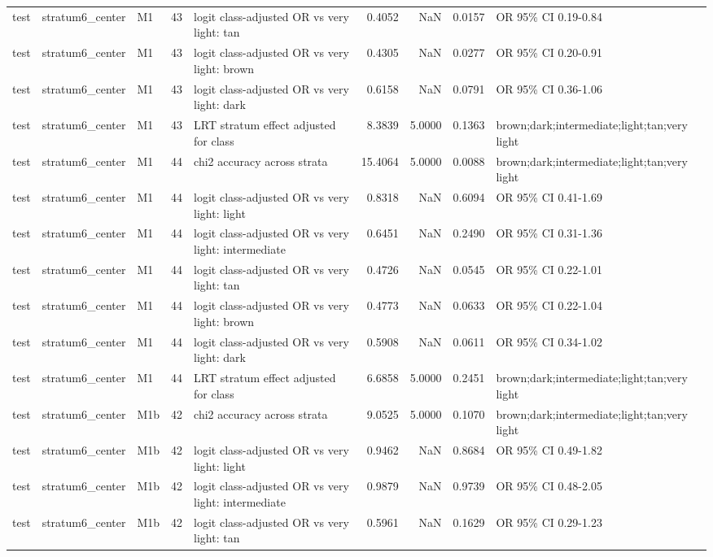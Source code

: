 \begin{tabular}{lllrlrrrl}
test & stratum6\_center & M1 & 43 & logit class-adjusted OR vs very light: tan & 0.4052 & NaN & 0.0157 & OR 95\% CI 0.19-0.84 \\
test & stratum6\_center & M1 & 43 & logit class-adjusted OR vs very light: brown & 0.4305 & NaN & 0.0277 & OR 95\% CI 0.20-0.91 \\
test & stratum6\_center & M1 & 43 & logit class-adjusted OR vs very light: dark & 0.6158 & NaN & 0.0791 & OR 95\% CI 0.36-1.06 \\
test & stratum6\_center & M1 & 43 & LRT stratum effect adjusted for class & 8.3839 & 5.0000 & 0.1363 & brown;dark;intermediate;light;tan;very light \\
test & stratum6\_center & M1 & 44 & chi2 accuracy across strata & 15.4064 & 5.0000 & 0.0088 & brown;dark;intermediate;light;tan;very light \\
test & stratum6\_center & M1 & 44 & logit class-adjusted OR vs very light: light & 0.8318 & NaN & 0.6094 & OR 95\% CI 0.41-1.69 \\
test & stratum6\_center & M1 & 44 & logit class-adjusted OR vs very light: intermediate & 0.6451 & NaN & 0.2490 & OR 95\% CI 0.31-1.36 \\
test & stratum6\_center & M1 & 44 & logit class-adjusted OR vs very light: tan & 0.4726 & NaN & 0.0545 & OR 95\% CI 0.22-1.01 \\
test & stratum6\_center & M1 & 44 & logit class-adjusted OR vs very light: brown & 0.4773 & NaN & 0.0633 & OR 95\% CI 0.22-1.04 \\
test & stratum6\_center & M1 & 44 & logit class-adjusted OR vs very light: dark & 0.5908 & NaN & 0.0611 & OR 95\% CI 0.34-1.02 \\
test & stratum6\_center & M1 & 44 & LRT stratum effect adjusted for class & 6.6858 & 5.0000 & 0.2451 & brown;dark;intermediate;light;tan;very light \\
test & stratum6\_center & M1b & 42 & chi2 accuracy across strata & 9.0525 & 5.0000 & 0.1070 & brown;dark;intermediate;light;tan;very light \\
test & stratum6\_center & M1b & 42 & logit class-adjusted OR vs very light: light & 0.9462 & NaN & 0.8684 & OR 95\% CI 0.49-1.82 \\
test & stratum6\_center & M1b & 42 & logit class-adjusted OR vs very light: intermediate & 0.9879 & NaN & 0.9739 & OR 95\% CI 0.48-2.05 \\
test & stratum6\_center & M1b & 42 & logit class-adjusted OR vs very light: tan & 0.5961 & NaN & 0.1629 & OR 95\% CI 0.29-1.23 \\

\end{tabular}

